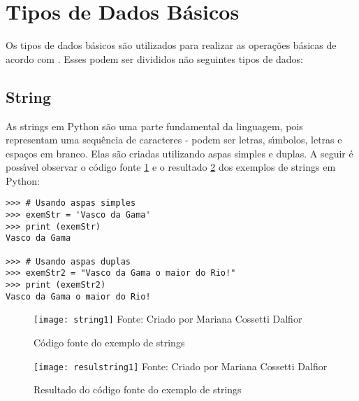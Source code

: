     \section{Tipos de Dados B\'{a}sicos}

Os tipos de dados b\'{a}sicos s\~{a}o utilizados para realizar as opera\c{c}\~{o}es b\'{a}sicas de acordo com \cite{Miller2019}. Esses podem ser divididos n\~{a}o seguintes tipos de dados:

            \subsection{String} \label{subsec:str}
As strings em Python s\~{a}o uma parte fundamental da linguagem, pois representam uma sequ\^{e}ncia de caracteres - podem ser letras, s\'{\i}mbolos, letras e espa\c{c}os em branco. Elas s\~{a}o criadas utilizando aspas simples e duplas. A seguir \'{e} poss\'{\i}vel observar o c\'{o}digo fonte \ref{fontestring} e o resultado \ref{resulstring} dos exemplos de strings em Python:

\begin{lstlisting}
>>> # Usando aspas simples
>>> exemStr = 'Vasco da Gama'
>>> print (exemStr)  
Vasco da Gama

>>> # Usando aspas duplas
>>> exemStr2 = "Vasco da Gama o maior do Rio!"
>>> print (exemStr2)
Vasco da Gama o maior do Rio!
\end{lstlisting}

\begin{figure}[H]
	\begin{center}
		\caption{C\'{o}digo fonte do exemplo de strings} \label{fontestring}
		\texttt{[image: string1]} 
		\newline
		Fonte: Criado por Mariana Cossetti Dalfior
	\end{center}
\end{figure}

\begin{figure}[H]
	\begin{center}
		\caption{Resultado do c\'{o}digo fonte do exemplo de strings} \label{resulstring}
		\texttt{[image: resulstring1]} 
		\newline
		Fonte: Criado por Mariana Cossetti Dalfior
	\end{center}
\end{figure}

